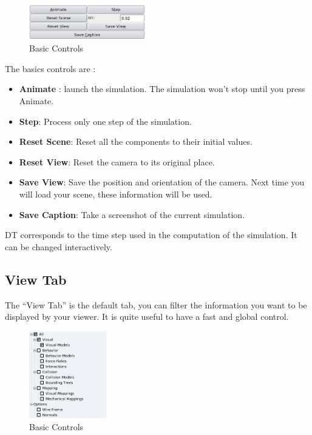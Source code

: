 \par

\begin{figure}
	\centering
		\includegraphics[width=0.45\textwidth]{GUI/GUI_basic.png}
	\caption{Basic Controls}
\end{figure}
\vspace{25mm}
The basics controls are :
\begin{itemize}
 \item {\bf Animate} : launch the simulation. The simulation won't stop until you press Animate.
 \item {\bf Step}: Process only one step of the simulation. 
 \item {\bf Reset Scene}: Reset all the components to their initial values.
 \item {\bf Reset View}: Reset the camera to its original place.
 \item {\bf Save View}: Save the position and orientation of the camera. Next time you will load your scene, these information will be used.
 \item {\bf Save Caption}: Take a screenshot of the current simulation.
\end{itemize}

DT corresponds to the time step used in the computation of the simulation. It can be changed interactively.










\subsection{View Tab}
The ``View Tab'' is the default tab, you can filter the information you want to be displayed by your viewer. It is quite useful to have a fast and global control. 

\begin{figure}[htpb]
	\centering
		\includegraphics[width=0.3\textwidth]{GUI/GUI_visual.png}
	\caption{Basic Controls}
\end{figure}

